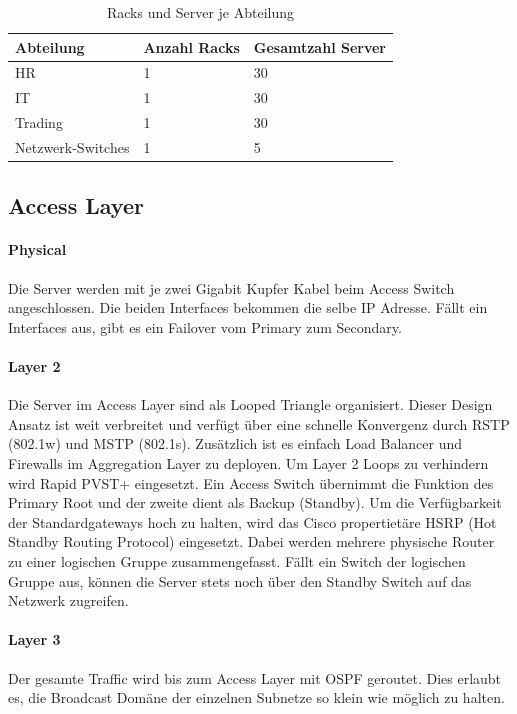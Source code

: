 \begin{table}[h]
	\centering
	\begin{tabu}{l l l}
		\toprule
		Abteilung & Anzahl Racks & Gesamtzahl Server \\
		\midrule
		HR & 1 & 30 \\
		IT & 1 & 30 \\
		Trading & 1 & 30 \\
		Netzwerk-Switches  & 1 & 5 \\
		\bottomrule
	\end{tabu}
	\caption{Racks und Server je Abteilung}
\end{table}


\subsection{Access Layer}
\paragraph{Physical}
Die Server werden mit je zwei Gigabit Kupfer Kabel beim Access Switch angeschlossen. Die beiden Interfaces bekommen die selbe IP Adresse. Fällt ein Interfaces aus, gibt es ein Failover vom Primary zum Secondary.

\paragraph{Layer 2}
Die Server im Access Layer sind als Looped Triangle organisiert. Dieser Design Ansatz ist weit verbreitet und verfügt über eine schnelle Konvergenz durch RSTP (802.1w) und MSTP (802.1s). Zusätzlich ist es einfach Load Balancer und Firewalls im Aggregation Layer zu deployen. Um Layer 2 Loops zu verhindern wird Rapid PVST+ eingesetzt. Ein Access Switch übernimmt die Funktion des Primary Root und der zweite dient als Backup (Standby). Um die Verfügbarkeit der Standardgateways hoch zu halten, wird das Cisco propertietäre HSRP (Hot Standby Routing Protocol) eingesetzt.  Dabei werden mehrere physische Router zu einer logischen Gruppe zusammengefasst. Fällt ein Switch der logischen Gruppe aus, können die Server stets noch über den Standby Switch auf das Netzwerk zugreifen. 

\paragraph{Layer 3}
Der gesamte Traffic wird bis zum Access Layer mit OSPF geroutet. Dies erlaubt es, die Broadcast Domäne der einzelnen Subnetze so klein wie möglich zu halten.

